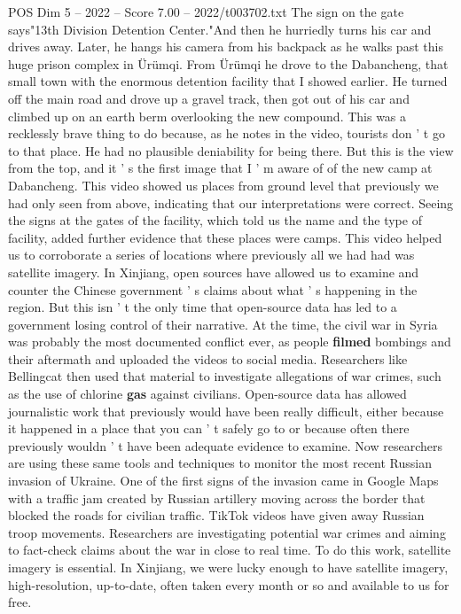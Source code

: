 \begin{textsample}{POS Dim 5 – 2022 – Score 7.00 – 2022/t003702.txt}
The sign on the gate says"13th Division Detention Center."And then he hurriedly turns his car and drives away.
Later, he hangs his camera from his backpack as he walks past this huge prison complex in Ürümqi.
From Ürümqi he drove to the Dabancheng, that small town with the enormous detention facility that I showed earlier.
He turned off the main road and drove up a gravel track, then got out of his car and climbed up on an earth berm overlooking the new compound.
This was a recklessly brave thing to do because, as he notes in the video, tourists don ' t go to that place.
He had no plausible deniability for being there.
But this is the view from the top, and it ' s the first image that I ' m aware of of the new camp at Dabancheng.
This video showed us places from ground level that previously we had only seen from above, indicating that our interpretations were correct.
Seeing the signs at the gates of the facility, which told us the name and the type of facility, added further evidence that these places were camps.
This video helped us to corroborate a series of locations where previously all we had had was satellite imagery.
In Xinjiang, open sources have allowed us to examine and counter the Chinese government ' s claims about what ' s happening in the region.
But this isn ' t the only time that open-source data has led to a government losing control of their narrative.
At the time, the civil war in Syria was probably the most documented conflict ever, as people \textbf{filmed} bombings and their aftermath and uploaded the videos to social media.
Researchers like Bellingcat then used that material to investigate allegations of war crimes, such as the use of chlorine \textbf{gas} against civilians.
Open-source data has allowed journalistic work that previously would have been really difficult, either because it happened in a place that you can ' t safely go to or because often there previously wouldn ' t have been adequate evidence to examine.
Now researchers are using these same tools and techniques to monitor the most recent Russian invasion of Ukraine.
One of the first signs of the invasion came in Google Maps with a traffic jam created by Russian artillery moving across the border that blocked the roads for civilian traffic.
TikTok videos have given away Russian troop movements.
Researchers are investigating potential war crimes and aiming to fact-check claims about the war in close to real time.
To do this work, satellite imagery is essential.
In Xinjiang, we were lucky enough to have satellite imagery, high-resolution, up-to-date, often taken every month or so and available to us for free.

\end{textsample}
